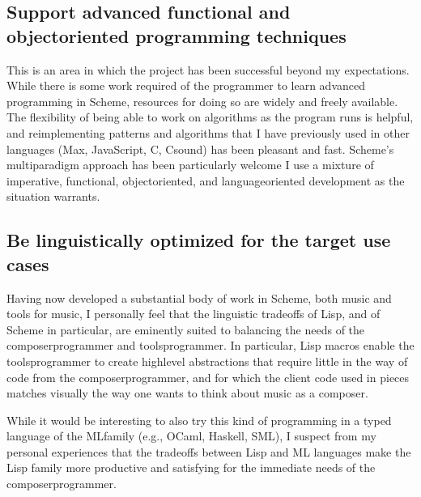 \documentclass[letterpaper,10pt,english]{sphinxmanual}
\begin{document}
\subsection{Support advanced functional and object\sphinxhyphen{}oriented programming techniques}
\label{\detokenize{conclusion:support-advanced-functional-and-object-oriented-programming-techniques}}
\sphinxAtStartPar
This is an area in which the project has been successful beyond my expectations.
While there is some work required of the programmer to learn advanced programming in Scheme,
resources for doing so are widely and freely available.
The flexibility of being able to work on algorithms as the program runs is helpful,
and reimplementing patterns and algorithms that I have previously used in other languages
(Max, JavaScript, C, Csound) has been pleasant and fast.
Scheme’s multi\sphinxhyphen{}paradigm approach has been particularly welcome \sphinxhyphen{} I use a mixture
of imperative, functional, object\sphinxhyphen{}oriented, and language\sphinxhyphen{}oriented development as the situation warrants.


\subsection{Be linguistically optimized for the target use cases}
\label{\detokenize{conclusion:be-linguistically-optimized-for-the-target-use-cases}}
\sphinxAtStartPar
Having now developed a substantial body of work in Scheme, both music and tools for music,
I personally feel that the linguistic trade\sphinxhyphen{}offs of Lisp, and of Scheme in particular,
are eminently suited to balancing the needs of the composer\sphinxhyphen{}programmer and tools\sphinxhyphen{}programmer.
In particular, Lisp macros
enable the tools\sphinxhyphen{}programmer to create high\sphinxhyphen{}level abstractions that require
little in the way of code from the composer\sphinxhyphen{}programmer, and for which the client code
used in pieces matches visually the way one wants to think about music as a composer.

\sphinxAtStartPar
While it would be interesting to also try this kind of programming in a typed language
of the ML\sphinxhyphen{}family (e.g., OCaml, Haskell, SML), I suspect from my personal experiences that
the trade\sphinxhyphen{}offs between Lisp and ML languages make the Lisp family more
productive and satisfying for the immediate needs of the composer\sphinxhyphen{}programmer.
\end{document}
